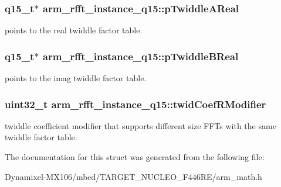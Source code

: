 \subsubsection[{\texorpdfstring{p\+Twiddle\+A\+Real}{pTwiddleAReal}}]{\setlength{\rightskip}{0pt plus 5cm}q15\+\_\+t$\ast$ arm\+\_\+rfft\+\_\+instance\+\_\+q15\+::p\+Twiddle\+A\+Real}\hypertarget{structarm__rfft__instance__q15_affbf2de522ac029432d98e8373c0ec53}{}\label{structarm__rfft__instance__q15_affbf2de522ac029432d98e8373c0ec53}
points to the real twiddle factor table. 
\subsubsection[{\texorpdfstring{p\+Twiddle\+B\+Real}{pTwiddleBReal}}]{\setlength{\rightskip}{0pt plus 5cm}q15\+\_\+t$\ast$ arm\+\_\+rfft\+\_\+instance\+\_\+q15\+::p\+Twiddle\+B\+Real}\hypertarget{structarm__rfft__instance__q15_a937d815022adc557b435ba8c6cd58b0d}{}\label{structarm__rfft__instance__q15_a937d815022adc557b435ba8c6cd58b0d}
points to the imag twiddle factor table. 
\subsubsection[{\texorpdfstring{twid\+Coef\+R\+Modifier}{twidCoefRModifier}}]{\setlength{\rightskip}{0pt plus 5cm}uint32\+\_\+t arm\+\_\+rfft\+\_\+instance\+\_\+q15\+::twid\+Coef\+R\+Modifier}\hypertarget{structarm__rfft__instance__q15_afd444d05858c5f419980e94e8240d5c3}{}\label{structarm__rfft__instance__q15_afd444d05858c5f419980e94e8240d5c3}
twiddle coefficient modifier that supports different size F\+F\+Ts with the same twiddle factor table. 

The documentation for this struct was generated from the following file\+:\begin{DoxyCompactItemize}
\item 
Dynamixel-\/\+M\+X106/mbed/\+T\+A\+R\+G\+E\+T\+\_\+\+N\+U\+C\+L\+E\+O\+\_\+\+F446\+R\+E/arm\+\_\+math.\+h\end{DoxyCompactItemize}
